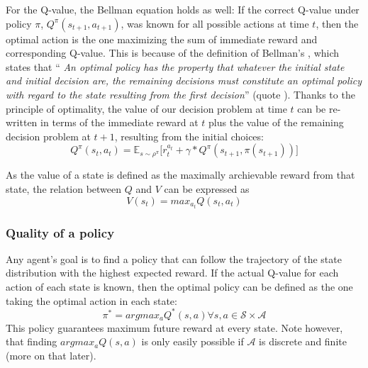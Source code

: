 For the Q-value, the Bellman equation holds as well: If the correct Q-value under policy $\pi$, $Q^\pi(s_{t+1},a_{t+1})$, was known for all possible actions at time $t$, then the optimal action is the one maximizing the sum of immediate reward and corresponding Q-value. This is because of the definition of Bellman's , which states that ``\kern-2pt \textit{An optimal policy has the property that whatever the initial state and initial decision are, the remaining decisions must constitute an optimal policy with regard to the state resulting from the first decision}''  (quote \cite{bellman_dynamic_nodate}). Thanks to the principle of optimality, the value of our decision problem at time $t$ can be re-written in terms of the immediate reward at $t$ plus the value of the remaining decision problem at $t+1$, resulting from the initial choices:
\begin{equation} \label{bellman}
	Q^\pi(s_t,a_t) =  \mathds{E}_{s\sim\rho^\pi} \big[r_t^{a_t} + \gamma *  Q^\pi(s_{t+1},\pi(s_{t+1}))  \big]
\end{equation}

As the value of a state is defined as the maximally archievable reward from that state, the relation between $Q$ and $V$ can be expressed as
\begin{equation} \label{eq:QandV}
V(s_t) = max_{a_t} Q(s_t, a_t)
\end{equation}

\subsubsection{Quality of a policy}

Any agent's goal is to find a policy that can follow the trajectory of the state distribution with the highest expected reward. If the actual Q-value for each action of each state is known, then the optimal policy can be defined as the one taking the optimal action in each state:
\begin{equation}
	\pi^* = argmax_aQ^*(s,a) \forall s,a \in \mathcal{S} \times \mathcal{A}
\end{equation}
This policy guarantees maximum future reward at every state. Note however, that finding $argmax_aQ(s,a)$ is only easily possible if $\mathcal{A}$ is discrete and finite (more on that later). 


